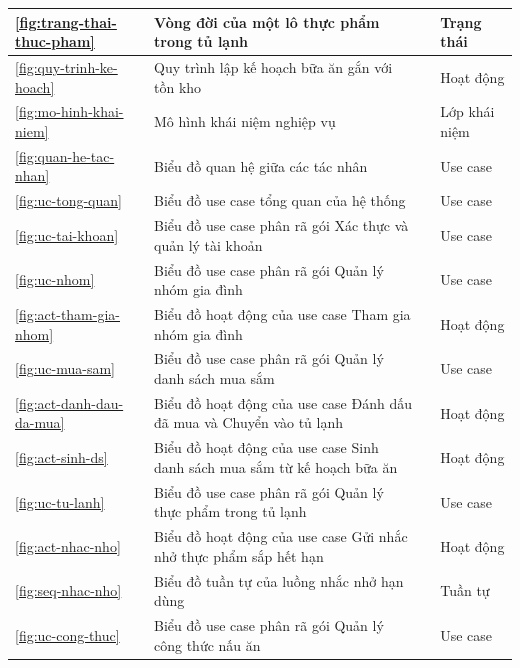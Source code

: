 {\begin{longtable}{|C{1.3cm}|L{\dimexpr{}\arrayrulewidth-1.3cm-5.6cm-2.4cm\relax}|L{5.6cm}|L{2.4cm}|}
\ref{fig:trang-thai-thuc-pham} & Vòng đời của một lô thực phẩm trong tủ lạnh &  & Trạng thái\\ \hline
\ref{fig:quy-trinh-ke-hoach} & Quy trình lập kế hoạch bữa ăn gắn với tồn kho &  & Hoạt động\\ \hline
\ref{fig:mo-hinh-khai-niem} & Mô hình khái niệm nghiệp vụ &  & Lớp khái niệm\\ \hline
\ref{fig:quan-he-tac-nhan} & Biểu đồ quan hệ giữa các tác nhân &  & Use case\\ \hline
\ref{fig:uc-tong-quan} & Biểu đồ use case tổng quan của hệ thống &  & Use case\\ \hline
\ref{fig:uc-tai-khoan} & Biểu đồ use case phân rã gói Xác thực và quản lý tài khoản &  & Use case\\ \hline
\ref{fig:uc-nhom} & Biểu đồ use case phân rã gói Quản lý nhóm gia đình &  & Use case\\ \hline
\ref{fig:act-tham-gia-nhom} & Biểu đồ hoạt động của use case Tham gia nhóm gia đình &  & Hoạt động\\ \hline
\ref{fig:uc-mua-sam} & Biểu đồ use case phân rã gói Quản lý danh sách mua sắm &  & Use case\\ \hline
\ref{fig:act-danh-dau-da-mua} & Biểu đồ hoạt động của use case Đánh dấu đã mua và Chuyển vào tủ lạnh &  & Hoạt động\\ \hline
\ref{fig:act-sinh-ds} & Biểu đồ hoạt động của use case Sinh danh sách mua sắm từ kế hoạch bữa ăn &  & Hoạt động\\ \hline
\ref{fig:uc-tu-lanh} & Biểu đồ use case phân rã gói Quản lý thực phẩm trong tủ lạnh &  & Use case\\ \hline
\ref{fig:act-nhac-nho} & Biểu đồ hoạt động của use case Gửi nhắc nhở thực phẩm sắp hết hạn &  & Hoạt động\\ \hline
\ref{fig:seq-nhac-nho} & Biểu đồ tuần tự của luồng nhắc nhở hạn dùng &  & Tuần tự\\ \hline
\ref{fig:uc-cong-thuc} & Biểu đồ use case phân rã gói Quản lý công thức nấu ăn &  & Use case\\ \hline

\end{longtable}}
